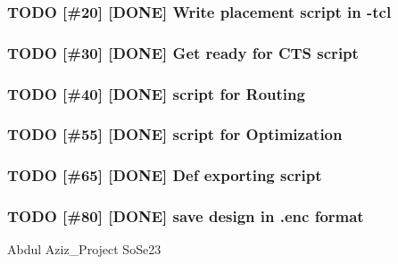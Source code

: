 \documentclass[a4paper]{article}
\begin{document}
\subsubsection{{\bfseries\sffamily TODO} [\#20] [DONE] Write placement script in -tcl}
\label{sec:org223ac47}
\subsubsection{{\bfseries\sffamily TODO} [\#30] [DONE] Get ready for CTS script}
\label{sec:org2025cbf}
\subsubsection{{\bfseries\sffamily TODO} [\#40] [DONE] script for Routing}
\label{sec:orge411eff}
\subsubsection{{\bfseries\sffamily TODO} [\#55] [DONE] script for Optimization}
\label{sec:org24e5a51}
\subsubsection{{\bfseries\sffamily TODO} [\#65] [DONE] Def exporting script}
\label{sec:orgf2773a8}
\subsubsection{{\bfseries\sffamily TODO} [\#80] [DONE] save design in .enc format}
\label{sec:org58f589a}
Abdul Aziz_Project SoSe23
\end{document}
